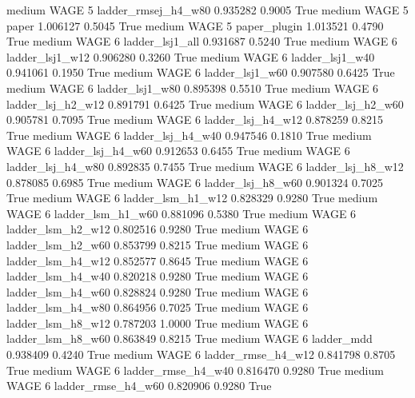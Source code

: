     medium     WAGE                 5 ladder_rmsej_h4_w80   0.935282      0.9005    True
    medium     WAGE                 5               paper   1.006127      0.5045    True
    medium     WAGE                 5        paper_plugin   1.013521      0.4790    True
    medium     WAGE                 6     ladder_lsj1_all   0.931687      0.5240    True
    medium     WAGE                 6     ladder_lsj1_w12   0.906280      0.3260    True
    medium     WAGE                 6     ladder_lsj1_w40   0.941061      0.1950    True
    medium     WAGE                 6     ladder_lsj1_w60   0.907580      0.6425    True
    medium     WAGE                 6     ladder_lsj1_w80   0.895398      0.5510    True
    medium     WAGE                 6   ladder_lsj_h2_w12   0.891791      0.6425    True
    medium     WAGE                 6   ladder_lsj_h2_w60   0.905781      0.7095    True
    medium     WAGE                 6   ladder_lsj_h4_w12   0.878259      0.8215    True
    medium     WAGE                 6   ladder_lsj_h4_w40   0.947546      0.1810    True
    medium     WAGE                 6   ladder_lsj_h4_w60   0.912653      0.6455    True
    medium     WAGE                 6   ladder_lsj_h4_w80   0.892835      0.7455    True
    medium     WAGE                 6   ladder_lsj_h8_w12   0.878085      0.6985    True
    medium     WAGE                 6   ladder_lsj_h8_w60   0.901324      0.7025    True
    medium     WAGE                 6   ladder_lsm_h1_w12   0.828329      0.9280    True
    medium     WAGE                 6   ladder_lsm_h1_w60   0.881096      0.5380    True
    medium     WAGE                 6   ladder_lsm_h2_w12   0.802516      0.9280    True
    medium     WAGE                 6   ladder_lsm_h2_w60   0.853799      0.8215    True
    medium     WAGE                 6   ladder_lsm_h4_w12   0.852577      0.8645    True
    medium     WAGE                 6   ladder_lsm_h4_w40   0.820218      0.9280    True
    medium     WAGE                 6   ladder_lsm_h4_w60   0.828824      0.9280    True
    medium     WAGE                 6   ladder_lsm_h4_w80   0.864956      0.7025    True
    medium     WAGE                 6   ladder_lsm_h8_w12   0.787203      1.0000    True
    medium     WAGE                 6   ladder_lsm_h8_w60   0.863849      0.8215    True
    medium     WAGE                 6          ladder_mdd   0.938409      0.4240    True
    medium     WAGE                 6  ladder_rmse_h4_w12   0.841798      0.8705    True
    medium     WAGE                 6  ladder_rmse_h4_w40   0.816470      0.9280    True
    medium     WAGE                 6  ladder_rmse_h4_w60   0.820906      0.9280    True
